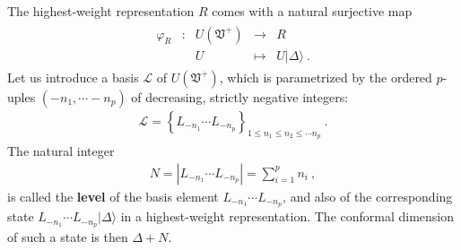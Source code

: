 \documentclass[12pt, a4paper, notitlepage, twoside]{report}
\numberwithin{equation}{section}
\theoremstyle{break}
\begin{document}
The highest-weight representation $R$
comes with a natural surjective map
\begin{align}
\begin{array}{cclcl}
 \varphi_R & : & U(\mathfrak{V}^+) & \rightarrow & R 
\\
 &  & U & \mapsto & U|\Delta\rangle \ .
\end{array}
\label{pur}
\end{align}
Let us introduce a basis $\mathcal{L}$ of $U(\mathfrak{V}^+)$, which is parametrized by the ordered $p$-uples $(-n_1,\cdots -n_p)$ of decreasing, strictly negative integers:
\begin{align}
\mathcal{L} =   \left\{ L_{-n_1} \cdots L_{-n_p}  \right\}_{1\leq n_1\leq n_2\leq \cdots n_p} \ .
\label{lels}
\end{align}
The natural integer
\begin{align}
 N=\left|L_{-n_1} \cdots L_{-n_p}\right|=\sum_{i=1}^p n_i \ ,
\label{nsn}
\end{align}
is called the \textbf{level} of the basis element $L_{-n_1} \cdots L_{-n_p}$, and also of the corresponding state $L_{-n_1} \cdots L_{-n_p}|\Delta\rangle$ in a highest-weight representation.
The conformal dimension of such a state is then $\Delta+N$. 
\end{document}
